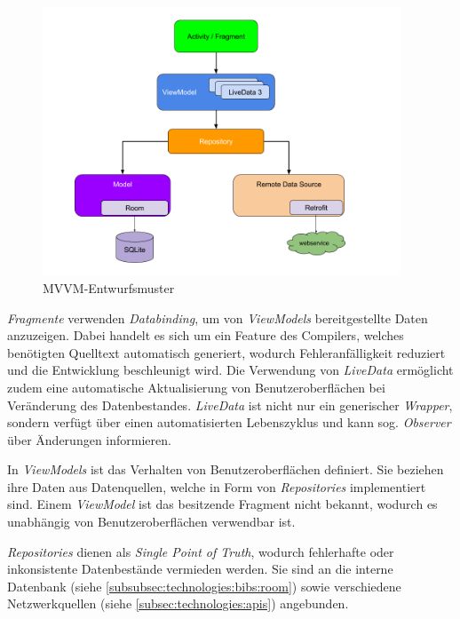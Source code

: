 \documentclass[a4paper]{article}
\begin{document}
\begin{figure}[H]
	\centering
	\includegraphics[height=8cm,keepaspectratio]{./images/mvvm-architecture.png}
	\caption{MVVM-Entwurfsmuster \autocite{mvvm_architecture}}
	\label{fig:technologies:architecture:mvvm}
\end{figure}

\textit{Fragmente} verwenden \textit{Databinding}, um von \textit{ViewModels} bereitgestellte Daten anzuzeigen.
Dabei handelt es sich um ein Feature des Compilers, welches benötigten Quelltext automatisch generiert, wodurch Fehleranfälligkeit reduziert und die Entwicklung beschleunigt wird.
Die Verwendung von \textit{LiveData} ermöglicht zudem eine automatische Aktualisierung von Benutzeroberflächen bei Veränderung des Datenbestandes.
\textit{LiveData} ist nicht nur ein generischer \textit{Wrapper}, sondern verfügt über einen automatisierten Lebenszyklus und kann sog. \textit{Observer} über Änderungen informieren.

In \textit{ViewModels} ist das Verhalten von Benutzeroberflächen definiert. Sie beziehen ihre Daten aus Datenquellen, welche in Form von \textit{Repositories} implementiert sind.
Einem \textit{ViewModel} ist das besitzende Fragment nicht bekannt, wodurch es unabhängig von Benutzeroberflächen verwendbar ist.

\textit{Repositories} dienen als \textit{Single Point of Truth}, wodurch fehlerhafte oder inkonsistente Datenbestände vermieden werden.
Sie sind an die interne Datenbank (siehe \autoref{subsubsec:technologies:bibs:room}) sowie verschiedene Netzwerkquellen (siehe \autoref{subsec:technologies:apis}) angebunden.
\end{document}
